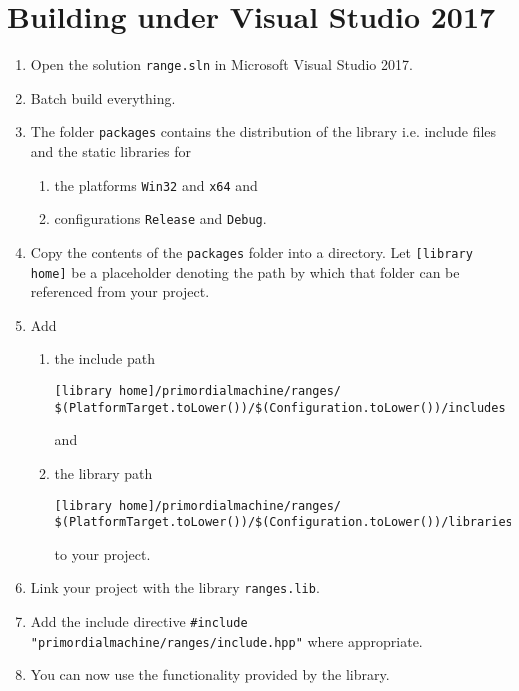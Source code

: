 \documentclass[oneside]{article}
\begin{document}
\section{Building under Visual Studio 2017}
\begin{enumerate}
\item Open the solution \texttt{range.sln} in Microsoft Visual Studio 2017.
\item Batch build everything.
\item The folder \texttt{packages} contains the distribution of the library i.e. include files and the
      static libraries for
  \begin{enumerate}
    \item the platforms \texttt{Win32} and \texttt{x64} and
    \item configurations \texttt{Release} and \texttt{Debug}.
  \end{enumerate}
\item Copy the contents of the \verb+packages+ folder into a directory. Let
      \verb+[library home]+ be a placeholder denoting the path by which that folder
      can be referenced from your project.
\item Add
  \begin{enumerate}
    \item the include path
\begin{verbatim}
[library home]/primordialmachine/ranges/
$(PlatformTarget.toLower())/$(Configuration.toLower())/includes
\end{verbatim}
	and
    \item the library path
\begin{verbatim}
[library home]/primordialmachine/ranges/
$(PlatformTarget.toLower())/$(Configuration.toLower())/libraries
\end{verbatim}
    to your project.
\end{enumerate}
\item Link your project with the library \verb+ranges.lib+.
\item Add the include directive \verb+#include "primordialmachine/ranges/include.hpp"+ where appropriate.
\item You can now use the functionality provided by the library.
\end{enumerate}
\end{document}
